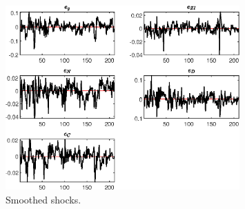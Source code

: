  
\begin{figure}[H]
\centering 
\includegraphics[width=0.80\textwidth]{BRS_growth_ext_util/graphs/BRS_growth_ext_util_SmoothedShocks1}
\caption{Smoothed shocks.}\label{Fig:SmoothedShocks:1}
\end{figure}


